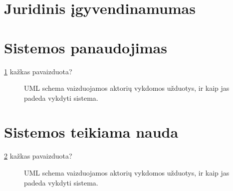\section{Juridinis įgyvendinamumas}


\section{Sistemos panaudojimas}


\ref{fig:uml_tasks} kažkas pavaizduota?

\begin{figure}[htb]
  \begin{center}
  \end{center}
  \caption{UML schema vaizduojamos aktorių vykdomos užduotys, ir kaip jas
    padeda vykdyti sistema.}
  \label{fig:uml_tasks}
\end{figure}

\section{Sistemos teikiama nauda}

\ref{fig:uml_tasks2} kažkas pavaizduota?

\begin{figure}[htb]
  \begin{center}
  \end{center}
  \caption{UML schema vaizduojamos aktorių vykdomos užduotys, ir kaip jas
    padeda vykdyti sistema.}
  \label{fig:uml_tasks2}
\end{figure}
